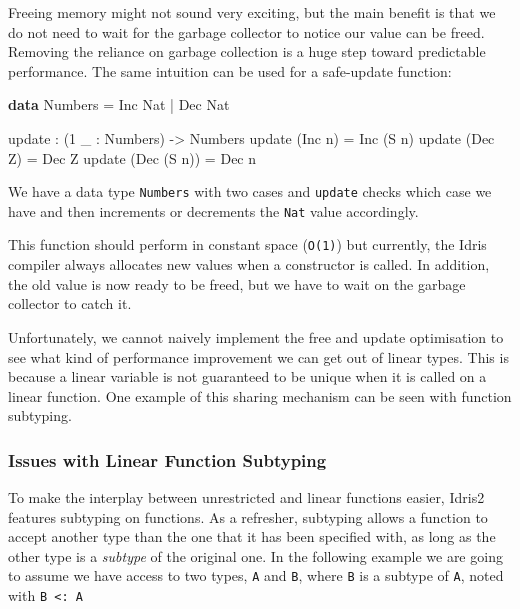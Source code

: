 \documentclass[
]{article}
\newenvironment{Shaded}{}{}
\newcommand{\DataTypeTok}[1]{\textcolor[rgb]{0.56,0.13,0.00}{#1}}
\newcommand{\DecValTok}[1]{\textcolor[rgb]{0.25,0.63,0.44}{#1}}
\newcommand{\KeywordTok}[1]{\textcolor[rgb]{0.00,0.44,0.13}{\textbf{#1}}}
\newcommand{\NormalTok}[1]{#1}
\newcommand{\OperatorTok}[1]{\textcolor[rgb]{0.40,0.40,0.40}{#1}}
\newcommand{\OtherTok}[1]{\textcolor[rgb]{0.00,0.44,0.13}{#1}}
\begin{document}
Freeing memory might not sound very exciting, but the main benefit is
that we do not need to wait for the garbage collector to notice our
value can be freed. Removing the reliance on garbage collection is a
huge step toward predictable performance. The same intuition can be used
for a safe-update function:

\begin{Shaded}
\begin{Highlighting}[]
\KeywordTok{data} \DataTypeTok{Numbers} \OtherTok{=} \DataTypeTok{Inc} \DataTypeTok{Nat} \OperatorTok{|} \DataTypeTok{Dec} \DataTypeTok{Nat}

\NormalTok{update }\OperatorTok{:}\NormalTok{ (}\DecValTok{1}\NormalTok{ \_ }\OperatorTok{:} \DataTypeTok{Numbers}\NormalTok{) }\OtherTok{{-}\textgreater{}} \DataTypeTok{Numbers}
\NormalTok{update (}\DataTypeTok{Inc}\NormalTok{ n) }\OtherTok{=} \DataTypeTok{Inc}\NormalTok{ (}\DataTypeTok{S}\NormalTok{ n)}
\NormalTok{update (}\DataTypeTok{Dec} \DataTypeTok{Z}\NormalTok{) }\OtherTok{=} \DataTypeTok{Dec} \DataTypeTok{Z}
\NormalTok{update (}\DataTypeTok{Dec}\NormalTok{ (}\DataTypeTok{S}\NormalTok{ n)) }\OtherTok{=} \DataTypeTok{Dec}\NormalTok{ n}
\end{Highlighting}
\end{Shaded}

We have a data type \texttt{Numbers} with two cases and \texttt{update}
checks which case we have and then increments or decrements the
\texttt{Nat} value accordingly.

This function should perform in constant space (\texttt{O(1)}) but
currently, the Idris compiler always allocates new values when a
constructor is called. In addition, the old value is now ready to be
freed, but we have to wait on the garbage collector to catch it.

Unfortunately, we cannot naively implement the free and update
optimisation to see what kind of performance improvement we can get out
of linear types. This is because a linear variable is not guaranteed to
be unique when it is called on a linear function. One example of this
sharing mechanism can be seen with function subtyping.

\hypertarget{issues-with-linear-function-subtyping}{%
\subsubsection{Issues with Linear Function
Subtyping}\label{issues-with-linear-function-subtyping}}

To make the interplay between unrestricted and linear functions easier,
Idris2 features subtyping on functions. As a refresher, subtyping allows
a function to accept another type than the one that it has been
specified with, as long as the other type is a \emph{subtype} of the
original one. In the following example we are going to assume we have
access to two types, \texttt{A} and \texttt{B}, where \texttt{B} is a
subtype of \texttt{A}, noted with \texttt{B\ \textless{}:\ A}
\end{document}
